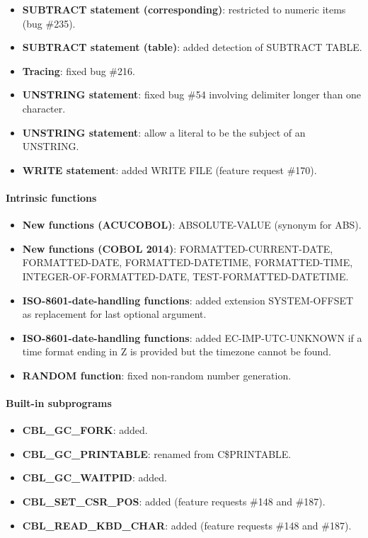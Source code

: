 \begin{itemize}
\item \textbf{SUBTRACT statement (corresponding)}: restricted to numeric items (bug \#235).
\item \textbf{SUBTRACT statement (table)}: added detection of SUBTRACT TABLE.
\item \textbf{Tracing}: fixed bug \#216.
\item \textbf{UNSTRING statement}: fixed bug \#54 involving delimiter longer than one character.
\item \textbf{UNSTRING statement}: allow a literal to be the subject of an UNSTRING.
\item \textbf{WRITE statement}: added WRITE FILE (feature request \#170).
\end{itemize}

\paragraph{Intrinsic functions}
\begin{itemize}
\item \textbf{New functions (ACUCOBOL)}: ABSOLUTE-VALUE (synonym for ABS).
\item \textbf{New functions (COBOL 2014)}: FORMATTED-CURRENT-DATE, FORMATTED-DATE, FORMATTED-DATETIME, FORMATTED-TIME, INTEGER-OF-FORMATTED-DATE, TEST-FORMATTED-DATETIME.
\item \textbf{ISO-8601-date-handling functions}: added extension SYSTEM-OFFSET as replacement for last optional argument.
\item \textbf{ISO-8601-date-handling functions}: added EC-IMP-UTC-UNKNOWN if a time format ending in Z is provided but the timezone cannot be found.
\item \textbf{RANDOM function}: fixed non-random number generation.
\end{itemize}

\paragraph{Built-in subprograms}
\begin{itemize}
\item \textbf{CBL\_GC\_FORK}: added.
\item \textbf{CBL\_GC\_PRINTABLE}: renamed from C\$PRINTABLE.
\item \textbf{CBL\_GC\_WAITPID}: added.
\item \textbf{CBL\_SET\_CSR\_POS}: added (feature requests \#148 and \#187).
\item \textbf{CBL\_READ\_KBD\_CHAR}: added (feature requests \#148 and \#187).
\end{itemize}

